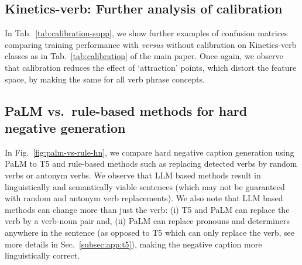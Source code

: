 \subsection{Kinetics-verb: Further analysis of calibration}\label{sec:app:calibration}
In Tab.~\ref{tab:calibration-supp}, we show further examples of confusion matrices comparing training performance with \textit{versus} without calibration on Kinetics-verb classes as in Tab.~\ref{tab:calibration} of the main paper. Once again, we observe that calibration reduces the effect of `attraction' points, which distort the feature space, by making  the same for all verb phrase concepts.

\subsection{PaLM vs.~rule-based methods for hard negative generation}\label{sec:app:palm-comparison-neg}
In Fig.~\ref{fig:palm-vs-rule-hn}, we compare hard negative caption generation using PaLM to T5 and rule-based methods such as replacing detected verbs by random verbs or antonym verbs. We observe that LLM based methods result in linguistically and semantically viable sentences (which may not be guaranteed with random and antonym verb replacements). We also note that LLM based methods can change more than just the verb: (i) T5 and PaLM can replace the verb by a verb-noun pair and, (ii) PaLM can replace pronouns and determiners anywhere in the sentence (as opposed to T5 which can only replace the verb, see more details in Sec.~\ref{subsec:app:t5}), making the negative caption more linguistically correct.





